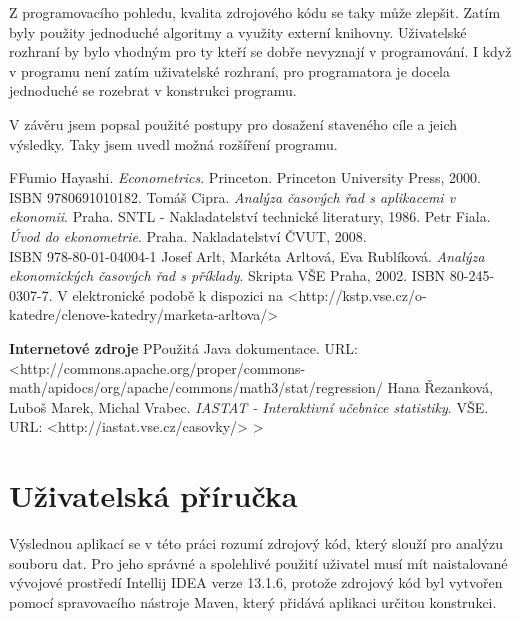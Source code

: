 \documentclass[a4paper,12pt,twoside]{scrreprt}
\begin{document}
Z programovacího pohledu, kvalita zdrojového kódu se taky může zlepšit. Zatím byly použity jednoduché algoritmy a využity externí knihovny. Uživatelské rozhraní by bylo vhodným pro ty kteří se dobře nevyznají v programování. I když v programu není zatím uživatelské rozhraní, pro programatora je docela jednoduché se rozebrat v konstrukci programu. 

V závěru jsem popsal použité postupy pro dosažení staveného cíle a jeich výsledky. Taky jsem uvedl možná rozšíření programu. 

\clearpage
{} %
\begin{thebibliography}{99}   
	\bibitem FFumio Hayashi. \emph{Econometrics}. Princeton. Princeton University Press, 2000. ISBN 9780691010182.
	 Tomáš Cipra. \emph{Analýza časových řad s aplikacemi v ekonomii}. Praha. SNTL - Nakladatelství technické literatury, 1986.
	 Petr Fiala. \emph{Úvod do ekonometrie}. Praha. Nakladatelství ČVUT, 2008. \\ ISBN 978-80-01-04004-1
	 Josef Arlt, Markéta Arltová, Eva Rublíková. \emph{Analýza ekonomických časových řad s příklady}. Skripta VŠE Praha, 2002. ISBN 80-245-0307-7. V elektronické podobě k dispozici na <http://kstp.vse.cz/o-katedre/clenove-katedry/marketa-arltova/>

	\normalsize\textbf{\newline Internetové zdroje}
	\bibitem PPoužitá Java dokumentace. URL: <http://commons.apache.org/proper/commons-math/apidocs/org/apache/commons/math3/stat/regression/
	 Hana Řezanková, Luboš Marek, Michal Vrabec. \emph{IASTAT - Interaktivní učebnice statistiky}. VŠE. URL: <http://iastat.vse.cz/casovky/>
> 	
	
\end{thebibliography}

\newpage %
\appendix %

\chapter{Uživatelská příručka} %

Výslednou aplikací se v této práci rozumí zdrojový kód, který slouží pro analýzu souboru dat. Pro jeho správné a spolehlivé použití uživatel musí mít naistalované vývojové prostředí Intellij IDEA verze 13.1.6, protože zdrojový kód byl vytvořen pomocí spravovacího nástroje Maven, který přidává aplikaci určitou konstrukci. 
\end{document}
